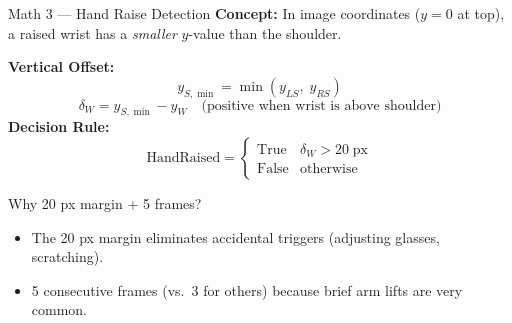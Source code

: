 \documentclass{beamer}
\begin{document}
\begin{frame}{Math 3 --- Hand Raise Detection}
\textbf{Concept:} In image coordinates ($y=0$ at top), a raised wrist has a \emph{smaller} $y$-value than the shoulder.
\vspace{0.3cm}

\textbf{Vertical Offset:}
\[ y_{S,\min} = \min(y_{LS},\;y_{RS}) \]
\[ \boxed{\delta_W = y_{S,\min} - y_W \quad \text{(positive when wrist is above shoulder)}} \]
\textbf{Decision Rule:}
\[ \text{HandRaised} = \begin{cases} \text{True} & \delta_W > 20\;\text{px} \\ \text{False} & \text{otherwise} \end{cases} \]
\begin{block}{Why 20 px margin + 5 frames?}
\begin{itemize}
    \item The 20 px margin eliminates accidental triggers (adjusting glasses, scratching).
    \item 5 consecutive frames (vs.\ 3 for others) because brief arm lifts are very common.
\end{itemize}
\end{block}
\end{frame}
\end{document}

